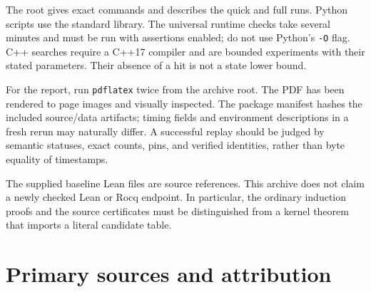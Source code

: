 \documentclass[11pt,a4paper]{article}
\theoremstyle{definition}
\newcommand{\file}[1]{\texttt{\path{#1}}}
\begin{document}
The root \file{README.md} gives exact commands and describes the quick
and full runs.  Python scripts use the standard library.  The universal
runtime checks take several minutes and must be run with assertions
enabled; do not use Python's \texttt{-O} flag.  C++ searches require a
C++17 compiler and are bounded experiments with their stated parameters.
Their absence of a hit is not a state lower bound.

For the report, run \texttt{pdflatex} twice from the archive root.  The
PDF has been rendered to page images and visually inspected.  The package
manifest hashes the included source/data artifacts; timing fields and
environment descriptions in a fresh rerun may naturally differ.  A
successful replay should be judged by semantic statuses, exact counts,
pins, and verified identities, rather than byte equality of timestamps.

The supplied baseline Lean files are source references.  This archive
does not claim a newly checked Lean or Rocq endpoint.  In particular,
the ordinary induction proofs and the source certificates must be
distinguished from a kernel theorem that imports a literal candidate table.

\section{Primary sources and attribution}
\label{sec:references}
\end{document}
